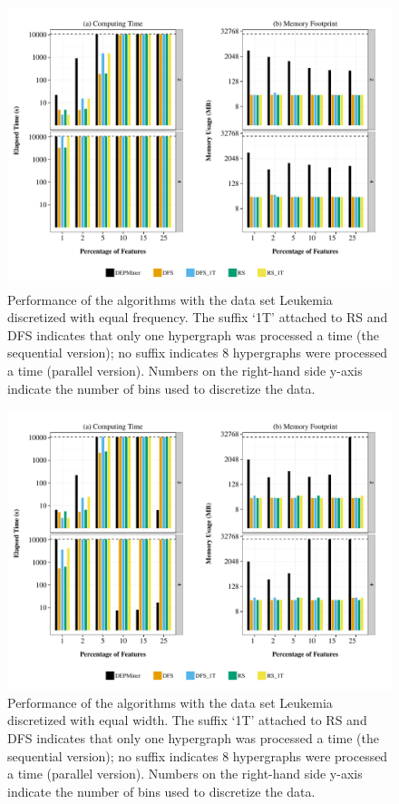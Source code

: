 \documentclass[12pt,a4paper]{article}
\begin{document}
\begin{figure}[htb]
\begin{center}
\includegraphics[scale=0.65]{leukemia_ef}
\end{center}
\caption{Performance of the algorithms with the data set Leukemia discretized with equal frequency.
The suffix `1T' attached to RS and DFS indicates that only one hypergraph was processed a time (the
sequential version); no suffix indicates 8 hypergraphs were processed a time (parallel version).
Numbers on the right-hand side y-axis indicate the number of bins used to discretize the data.}
\label{qcep:fig:leukemiaef}
\end{figure}

\begin{figure}
\begin{center}
\includegraphics[scale=0.65]{leukemia_ew}
\end{center}
\caption{Performance of the algorithms with the data set Leukemia discretized with equal width.
The suffix `1T' attached to RS and DFS indicates that only one hypergraph was processed a time (the
sequential version); no suffix indicates 8 hypergraphs were processed a time (parallel version).
Numbers on the right-hand side y-axis indicate the number of bins used to discretize the data.}
\label{qcep:fig:leukemiaew}
\end{figure}
\end{document}
